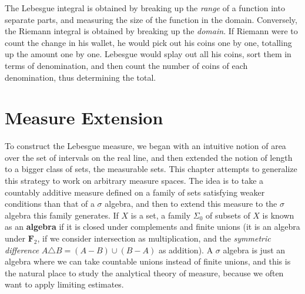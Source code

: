 The Lebesgue integral is obtained by breaking up the {\it range} of a function into separate parts, and measuring the size of the function in the domain. Conversely, the Riemann integral is obtained by breaking up the {\it domain}. If Riemann were to count the change in his wallet, he would pick out his coins one by one, totalling up the amount one by one. Lebesgue would splay out all his coins, sort them in terms of denomination, and then count the number of coins of each denomination, thus determining the total.


























\chapter{Measure Extension}

To construct the Lebesgue measure, we began with an intuitive notion of area over the set of intervals on the real line, and then extended the notion of length to a bigger class of sets, the measurable sets. This chapter attempts to generalize this strategy to work on arbitrary measure spaces. The idea is to take a countably additive measure defined on a family of sets satisfying weaker conditions than that of a $\sigma$ algebra, and then to extend this measure to the $\sigma$ algebra this family generates. If $X$ is a set, a family $\Sigma_0$ of subsets of $X$ is known as an {\bf algebra} if it is closed under complements and finite unions (it is an algebra under $\mathbf{F}_2$, if we consider intersection as multiplication, and the {\it symmetric difference} $A \triangle B = (A - B) \cup (B - A)$ as addition). A $\sigma$ algebra is just an algebra where we can take countable unions instead of finite unions, and this is the natural place to study the analytical theory of measure, because we often want to apply limiting estimates.

